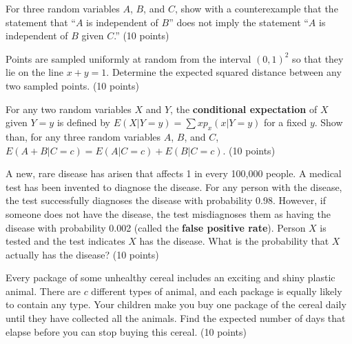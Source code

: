 \documentclass[fleqn]{homework}
\begin{document}
  \maketitle

  \begin{problem}{1}
    \begin{question}
      For three random variables $A$, $B$, and $C$, show with a counterexample
      that the statement that ``$A$ is independent of $B$'' does not imply the
      statement ``$A$ is independent of $B$ given $C$.'' (10 points)
    \end{question}
  \end{problem}

  \begin{problem}{2}
    \begin{question}
      Points are sampled uniformly at random from the interval $(0,1)^2$ so that
      they lie on the line $x+y=1$.  Determine the expected squared distance
      between any two sampled points. (10 points)
    \end{question}
  \end{problem}

  \begin{problem}{3}
    \begin{question}
      For any two random variables $X$ and $Y$, the \textbf{conditional
        expectation} of $X$ given $Y=y$ is defined by
      $E(X|Y=y) = \sum x p_x(x|Y=y)$ for a fixed $y$.  Show than, for any three
      random variables $A$, $B$, and $C$, $E(A+B|C=c) = E(A|C=c) +
      E(B|C=c)$. (10 points)
    \end{question}
  \end{problem}

  \begin{problem}{4}
    \begin{question}
      A new, rare disease has arisen that affects 1 in every 100,000 people.  A
      medical test has been invented to diagnose the disease.  For any person
      with the disease, the test successfully diagnoses the disease with
      probability 0.98.  However, if someone does not have the disease, the test
      misdiagnoses them as having the disease with probability 0.002 (called the
      \textbf{false positive rate}).  Person $X$ is tested and the test
      indicates $X$ has the disease.  What is the probability that $X$ actually
      has the disease? (10 points)
    \end{question}
  \end{problem}

  \begin{problem}{5}
    \begin{question}
      Every package of some unhealthy cereal includes an exciting and shiny
      plastic animal.  There are $c$ different types of animal, and each package
      is equally likely to contain any type.  Your children make you buy one
      package of the cereal daily until they have collected all the animals.
      Find the expected number of days that elapse before you can stop buying
      this cereal. (10 points)
    \end{question}
  \end{problem}
\end{document}
